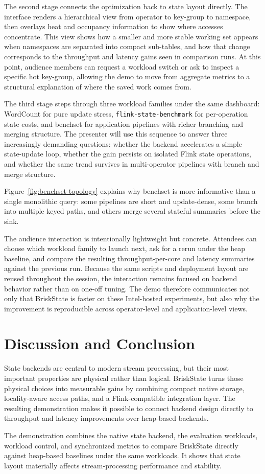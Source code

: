 \documentclass[sigconf,nonacm]{acmart}
\newcommand{\briskstate}{BriskState\xspace}
\begin{document}
The second stage connects the optimization back to state layout directly. The interface renders a hierarchical view from operator to key-group to namespace, then overlays heat and occupancy information to show where accesses concentrate. This view shows how a smaller and more stable working set appears when namespaces are separated into compact sub-tables, and how that change corresponds to the throughput and latency gains seen in comparison runs. At this point, audience members can request a workload switch or ask to inspect a specific hot key-group, allowing the demo to move from aggregate metrics to a structural explanation of where the saved work comes from.

The third stage steps through three workload families under the same dashboard: WordCount for pure update stress, \texttt{flink-state-benchmark} for per-operation state costs, and benchset for application pipelines with richer branching and merging structure. The presenter will use this sequence to answer three increasingly demanding questions: whether the backend accelerates a simple state-update loop, whether the gain persists on isolated Flink state operations, and whether the same trend survives in multi-operator pipelines with branch and merge structure.

Figure~\ref{fig:benchset-topology} explains why benchset is more informative than a single monolithic query: some pipelines are short and update-dense, some branch into multiple keyed paths, and others merge several stateful summaries before the sink.

The audience interaction is intentionally lightweight but concrete. Attendees can choose which workload family to launch next, ask for a rerun under the heap baseline, and compare the resulting throughput-per-core and latency summaries against the previous run. Because the same scripts and deployment layout are reused throughout the session, the interaction remains focused on backend behavior rather than on one-off tuning. The demo therefore communicates not only that BriskState is faster on these Intel-hosted experiments, but also why the improvement is reproducible across operator-level and application-level views.

\section{Discussion and Conclusion}
State backends are central to modern stream processing, but their most important properties are physical rather than logical. \briskstate turns those physical choices into measurable gains by combining compact native storage, locality-aware access paths, and a Flink-compatible integration layer. The resulting demonstration makes it possible to connect backend design directly to throughput and latency improvements over heap-based backends.

The demonstration combines the native state backend, the evaluation workloads, workload control, and synchronized metrics to compare \briskstate directly against heap-based baselines under the same workloads. It shows that state layout materially affects stream-processing performance and stability.

\balance


\end{document}
